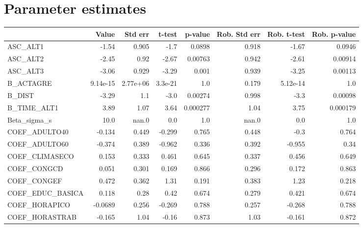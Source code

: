 \section{Parameter estimates}
\begin{tabular}{lrrrrrrr}
\toprule
{} &    Value &  Std err &   t-test &  p-value &  Rob. Std err &  Rob. t-test &  Rob. p-value \\
\midrule
ASC\_ALT1         &    -1.54 &    0.905 &     -1.7 &   0.0898 &         0.918 &        -1.67 &        0.0946 \\
ASC\_ALT2         &    -2.45 &     0.92 &    -2.67 &  0.00763 &         0.942 &        -2.61 &       0.00914 \\
ASC\_ALT3         &    -3.06 &    0.929 &    -3.29 &    0.001 &         0.939 &        -3.25 &       0.00113 \\
B\_ACTAGRE        & 9.14e-15 & 2.77e+06 &  3.3e-21 &      1.0 &         0.179 &     5.12e-14 &           1.0 \\
B\_DIST           &    -3.29 &      1.1 &     -3.0 &  0.00274 &         0.998 &         -3.3 &       0.00098 \\
B\_TIME\_ALT1      &     3.89 &     1.07 &     3.64 & 0.000277 &          1.04 &         3.75 &      0.000179 \\
Beta\_sigma\_s     &     10.0 &    nan.0 &      0.0 &      1.0 &         nan.0 &          0.0 &           1.0 \\
COEF\_ADULTO40    &   -0.134 &    0.449 &   -0.299 &    0.765 &         0.448 &         -0.3 &         0.764 \\
COEF\_ADULTO60    &   -0.374 &    0.389 &   -0.962 &    0.336 &         0.392 &       -0.955 &          0.34 \\
COEF\_CLIMASECO   &    0.153 &    0.333 &    0.461 &    0.645 &         0.337 &        0.456 &         0.649 \\
COEF\_CONGCD      &    0.051 &    0.301 &    0.169 &    0.866 &         0.296 &        0.172 &         0.863 \\
COEF\_CONGEF      &    0.472 &    0.362 &     1.31 &    0.191 &         0.383 &         1.23 &         0.218 \\
COEF\_EDUC\_BASICA &    0.118 &     0.28 &     0.42 &    0.674 &         0.279 &        0.421 &         0.674 \\
COEF\_HORAPICO    &  -0.0689 &    0.256 &   -0.269 &    0.788 &         0.257 &       -0.268 &         0.788 \\
COEF\_HORASTRAB   &   -0.165 &     1.04 &    -0.16 &    0.873 &          1.03 &       -0.161 &         0.872 \\

\end{tabular}
